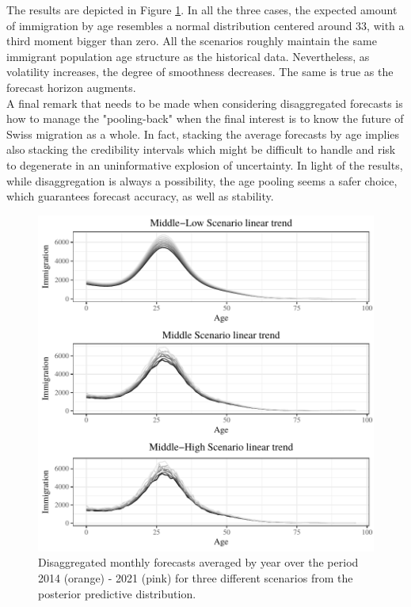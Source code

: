 \documentclass{article}\usepackage[]{graphicx}\usepackage[]{color}
\begin{document}
The results are depicted in Figure \ref{fig:forecast age}. In all the three cases, the expected amount of immigration by age resembles a normal distribution centered around 33, with a third moment bigger than zero. All the scenarios roughly maintain the same immigrant population age structure as the historical data. Nevertheless, as volatility increases, the degree of smoothness decreases. The same is true as the forecast horizon augments. \\
A final remark that needs to be made when considering disaggregated forecasts is how to manage the "pooling-back" when the final interest is to know the future of Swiss migration as a whole. In fact, stacking the average forecasts by age implies also stacking the credibility intervals which might be difficult to handle and risk to degenerate in an uninformative explosion of uncertainty. In light of the results, while disaggregation is always a possibility, the age pooling seems a safer choice, which guarantees forecast accuracy, as well as stability.




\begin{figure}
\centering
\includegraphics[scale=.8]{Plot_forecasts_age.pdf}
\caption{Disaggregated monthly forecasts averaged by year over the period 2014 (orange) - 2021 (pink) for three different scenarios from the posterior predictive distribution.}
\label{fig:forecast age}
\end{figure}
\end{document}
